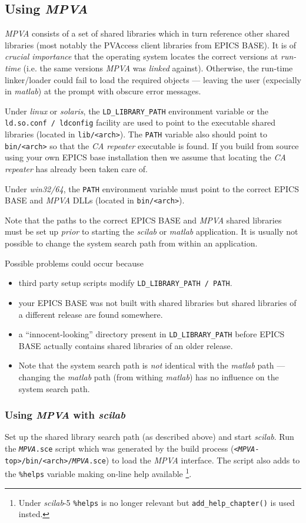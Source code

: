 \documentclass{article}
\newcommand{\sca}{\ita{MPVA}}
\newcommand{\scilab}{\ita{scilab}}
\newcommand{\matlab}{\ita{matlab}}
\newcommand{\windoze}{\ita{win32/64}}
\newcommand{\com}[1]{{\tt #1}}
\newcommand{\pbrk}{\pagebreak[3]}
\newcommand{\ita}[1]{\emph{#1}}
\renewcommand{\pbrk}{}
\begin{document}
\pbrk
\subsection{Using \sca{}}
\label{usingsca}
\sca{} consists of a set of shared libraries which in turn reference
other shared libraries (most notably the PVAccess client libraries
from EPICS BASE). It is of \ita{crucial importance} that the operating
system locates the correct versions at \ita{run-time} (i.e. the same versions
\sca{} was \ita{linked} against). Otherwise, the run-time linker/loader
could fail to load the required objects --- leaving the user (expecially
in \matlab) at the prompt with obscure error messages.

Under \ita{linux} or \ita{solaris}, the \com{LD\_LIBRARY\_PATH} environment
variable or the \com{ld.so.conf / ldconfig} facility are used to point
to the executable shared libraries (located in \com{lib/<arch>}).
The \com{PATH} variable also should point
to \com{bin/<arch>} so that the \ita{CA repeater} executable is found.
If you build from source using your own EPICS base installation then
we assume that locating the \ita{CA repeater} has already been taken
care of.

Under \windoze{}, the \com{PATH} environment variable must point to the
correct EPICS BASE and \sca{} DLLs (located in \com{bin/<arch>}).

Note that the paths to the correct EPICS BASE and \sca{} shared libraries
must be set up \ita{prior} to starting the \scilab{} or \matlab{} application.
It is usually not possible to change the system search
path from within an application.

Possible problems could occur because
\begin{itemize}
\item third party setup scripts modify \com{LD\_LIBRARY\_PATH / PATH}.
\item your EPICS BASE was not built with shared libraries but shared libraries
of a different release are found somewhere.
\item a ``innocent-looking'' directory present in \com{LD\_LIBRARY\_PATH}
before EPICS BASE actually contains shared libraries of an older release.
\item Note that the system search path is \ita{not} identical with the
\matlab{} path --- changing the \matlab{} path (from withing \matlab)
has no influence on the system search path.
\end{itemize}

\subsubsection{Using \sca{} with \scilab}
Set up the shared library search path (as described above) and start
\scilab. Run the \com{\sca.sce} script which was generated by the build process
(\com{<\sca-top>/bin/<arch>/\sca.sce}) to load the \sca{} interface.
The script also adds to the \com{\%helps} variable making on-line
help available%
\footnote{
Under \scilab{-5} \com{\%helps} is no longer relevant
but \com{add\_help\_chapter()} is used insted.
}.
\end{document}
